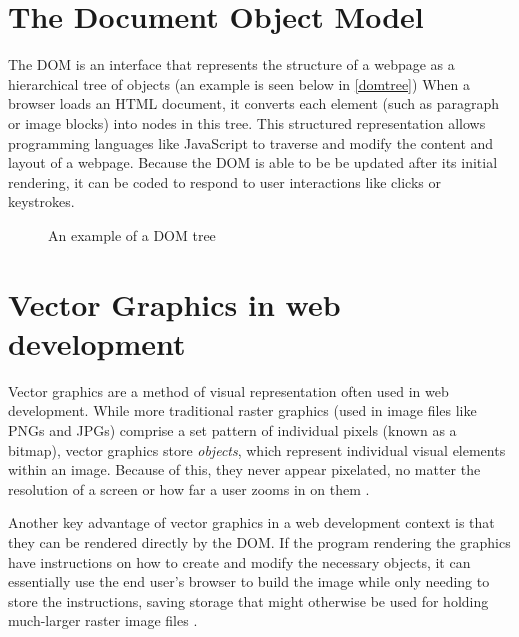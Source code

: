 

\section{The Document Object Model}

The DOM is an interface that represents the structure of a webpage as a hierarchical tree of objects (an example is seen below in \autoref{domtree}) When a browser loads an HTML document, it converts each element (such as paragraph or image blocks) into nodes in this tree. This structured representation allows programming languages like JavaScript to traverse and modify the content and layout of a webpage. Because the DOM is able to be be updated after its initial rendering, it can be coded to respond to user interactions like clicks or keystrokes.

\begin{figure}[!ht]
	\begin{center}
		\caption{An example of a DOM tree}\label{domtree}
	\end{center}
\end{figure}

\section{Vector Graphics in web development}

Vector graphics are a method of visual representation often used in web development. While more traditional raster graphics (used in image files like PNGs and JPGs) comprise a set pattern of individual pixels (known as a bitmap), vector graphics store \textit{objects}, which represent individual visual elements within an image. Because of this, they never appear pixelated, no matter the resolution of a screen or how far a user zooms in on them \cite{kirsanov_book_2021}.

Another key advantage of vector graphics in a web development context is that they can be rendered directly by the DOM. If the program rendering the graphics have instructions on how to create and modify the necessary objects, it can essentially use the end user's browser to build the image while only needing to store the instructions, saving storage that might otherwise be used for holding much-larger raster image files \cite{meeks_d3js_2024}.

